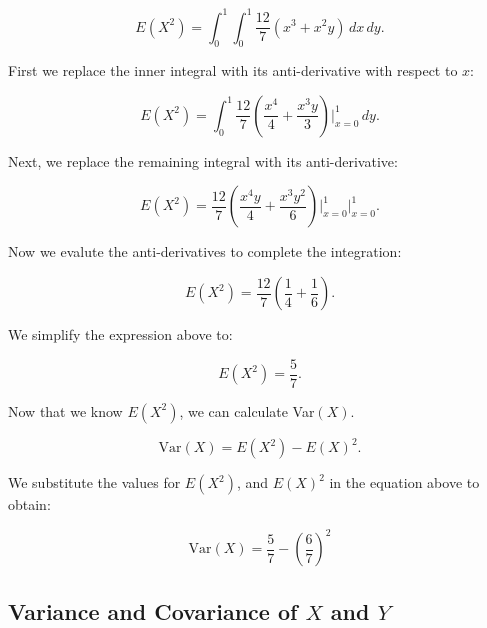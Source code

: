 \documentclass[a5paper,11pt]{article}
\begin{document}
\begin{equation}
E \left(X^2 \right)  =
\int_0^1 \int_0^1  \frac{12}{7} \left(
x^3 + x^2y \right) \,dx \,dy. 
\end{equation}

First we replace the inner integral with its
anti-derivative with respect to $x$:

\begin{equation}
E \left(X^2 \right)  =
\int_0^1 \frac{12}{7} \left(
\frac{x^4}{4} + \frac{x^3y}{3} 
\right) \bigg\rvert_{x=0}^1\,dy. 
\end{equation}

Next, we replace the remaining integral
with its anti-derivative:

\begin{equation}
E \left(X^2 \right)  =
 \frac{12}{7} \left(
\frac{x^4y}{4} + \frac{x^3y^2}{6} 
\right) \bigg\rvert_{x=0}^1 
\bigg\rvert_{x=0}^1.
\end{equation}

Now we evalute the anti-derivatives to
complete the integration:

\begin{equation}
E \left(X^2 \right)  =
\frac{12}{7}\left(\frac{1}{4}
+ \frac{1}{6} \right).
\end{equation}

We simplify the expression above to:

\begin{equation}
E \left(X^2 \right)  =
\frac{5}{7}.
\end{equation}

Now that we know $E\left(X^2 \right)$,
we can calculate Var$\left(X \right)$.

\begin{equation}
\text{Var}\left(X \right)=
E\left(X^2 \right) -
E \left(X \right)^2.
\end{equation}

We substitute the values for 
$E\left(X^2 \right)$, and 
$E\left(X \right)^2$ in the equation above
to obtain:

\begin{equation}
\text{Var}\left(X \right)=
\frac{5}{7} -
\left( \frac{6}{7} \right)^2
\end{equation}

\subsection{Variance and Covariance of
$X$ and $Y$}
\end{document}
